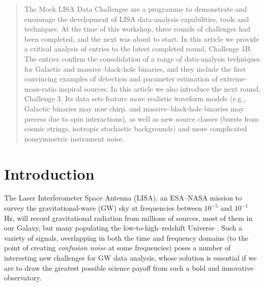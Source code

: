 \documentclass{iopart}
\begin{document}

\begin{abstract}
The Mock LISA Data Challenges are a programme to demonstrate and encourage the development of LISA data-analysis capabilities, tools and techniques. At the time of this workshop, three rounds of challenges had been completed, and the next was about to start.
In this article we provide a critical analysis of entries to the latest completed round, Challenge 1B. The entries confirm the consolidation of a range of data-analysis techniques for Galactic and massive--black-hole binaries, and they include the first convincing examples of detection and parameter estimation of extreme--mass-ratio inspiral sources.
In this article we also introduce the next round, Challenge 3. Its data sets feature more realistic waveform models (e.g., Galactic binaries may now chirp, and massive--black-hole binaries may precess due to spin interactions), as well as new source classes (bursts from cosmic strings, isotropic stochastic backgrounds) and more complicated nonsymmetric instrument noise.
\end{abstract}

\vspace{-0.5cm}



\section{Introduction}

The Laser Interferometer Space Antenna (LISA), an ESA--NASA mission to survey the gravitational-wave (GW) sky at frequencies between $10^{-5}$ and $10^{-1}$ Hz, will record gravitational radiation from millions of sources, most of them in our Galaxy, but many populating the low-to-high--redshift Universe \cite{lisa}.
Such a variety of signals, overlapping in both the time and frequency domains (to the point of creating \emph{confusion noise} at some frequencies) poses a number of interesting new challenges for GW data analysis, whose solution is essential if we are to draw the greatest possible science payoff from such a bold and innovative observatory.
\end{document}

